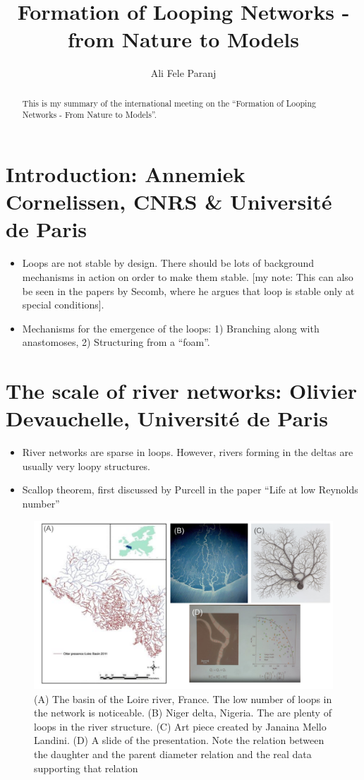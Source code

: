 \documentclass[12pt,a4paper]{article}
\title{Formation of Looping Networks - from Nature to Models}
\author{Ali Fele Paranj}
\begin{document}
	\maketitle
	\begin{abstract}
		This is my summary of the international meeting on the ``Formation of Looping Networks - From Nature to Models''.
	\end{abstract}
	
	\section{Introduction: Annemiek Cornelissen, CNRS \& Université de Paris}
	\begin{itemize}
		\item Loops are not stable by design. There should be lots of background mechanisms in action on order to make them stable. [my note: This can also be seen in the papers by Secomb, where he argues that loop is stable only at special conditions].
		\item Mechanisms for the emergence of the loops: 1) Branching along with anastomoses, 2) Structuring from a ``foam''.
	\end{itemize}
	
	\section{The scale of river networks: Olivier Devauchelle, Université de Paris}
	\begin{itemize}
		\item River networks are sparse in loops. However, rivers forming in the deltas are usually  very loopy structures. 
		\item Scallop theorem, first discussed by Purcell in the paper ``Life at low Reynolds number''
	\end{itemize}
	
	
	\begin{figure}[h!]
		\centering
		\includegraphics[width=0.7\linewidth]{OlivierTalk.pdf}
		\caption{(A) The basin of the Loire river, France. The low number of loops in the network is noticeable. (B) Niger delta, Nigeria. The are plenty of loops in the river structure. (C) Art piece created by Janaina Mello Landini. (D) A slide of the presentation. Note the relation between the daughter and the parent diameter relation and the real data supporting that relation}
	\end{figure}
	\FloatBarrier
	
\end{document}
